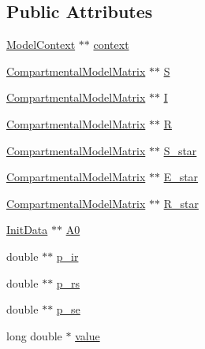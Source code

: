 \subsection*{Public Attributes}
\begin{DoxyCompactItemize}
\item 
\hyperlink{classSpatialSEIR_1_1ModelContext}{Model\-Context} $\ast$$\ast$ \hyperlink{classSpatialSEIR_1_1FC__I0_aec6c021bd72108821299dca140ec8b6e}{context}
\item 
\hyperlink{classSpatialSEIR_1_1CompartmentalModelMatrix}{Compartmental\-Model\-Matrix} $\ast$$\ast$ \hyperlink{classSpatialSEIR_1_1FC__I0_a32d56d02b4f1cc6a1394104cc45d6d5d}{S}
\item 
\hyperlink{classSpatialSEIR_1_1CompartmentalModelMatrix}{Compartmental\-Model\-Matrix} $\ast$$\ast$ \hyperlink{classSpatialSEIR_1_1FC__I0_abed267a2d412d94515c38468b4995297}{I}
\item 
\hyperlink{classSpatialSEIR_1_1CompartmentalModelMatrix}{Compartmental\-Model\-Matrix} $\ast$$\ast$ \hyperlink{classSpatialSEIR_1_1FC__I0_a6e9167bd8ec8794cc413b1109317f23e}{R}
\item 
\hyperlink{classSpatialSEIR_1_1CompartmentalModelMatrix}{Compartmental\-Model\-Matrix} $\ast$$\ast$ \hyperlink{classSpatialSEIR_1_1FC__I0_ad631c68300d51c2866204a5486706c0b}{S\-\_\-star}
\item 
\hyperlink{classSpatialSEIR_1_1CompartmentalModelMatrix}{Compartmental\-Model\-Matrix} $\ast$$\ast$ \hyperlink{classSpatialSEIR_1_1FC__I0_a671eca4d02352fd5cd3a1c2a2960c5cf}{E\-\_\-star}
\item 
\hyperlink{classSpatialSEIR_1_1CompartmentalModelMatrix}{Compartmental\-Model\-Matrix} $\ast$$\ast$ \hyperlink{classSpatialSEIR_1_1FC__I0_a70a7f699e9da71d33ed74c27747c69d1}{R\-\_\-star}
\item 
\hyperlink{classSpatialSEIR_1_1InitData}{Init\-Data} $\ast$$\ast$ \hyperlink{classSpatialSEIR_1_1FC__I0_a30c65326a76d65ed05040aa32fd1385c}{A0}
\item 
double $\ast$$\ast$ \hyperlink{classSpatialSEIR_1_1FC__I0_ae21756cfc313d026a673343ce736e79f}{p\-\_\-ir}
\item 
double $\ast$$\ast$ \hyperlink{classSpatialSEIR_1_1FC__I0_a42de4548f29af1c2e2d9409d58a2af12}{p\-\_\-rs}
\item 
double $\ast$$\ast$ \hyperlink{classSpatialSEIR_1_1FC__I0_a9708209e3d96f2f19762c5ce5e6da13f}{p\-\_\-se}
\item 
long double $\ast$ \hyperlink{classSpatialSEIR_1_1FC__I0_a81955b1dfdaf09a58122944420b40750}{value}
\end{DoxyCompactItemize}


